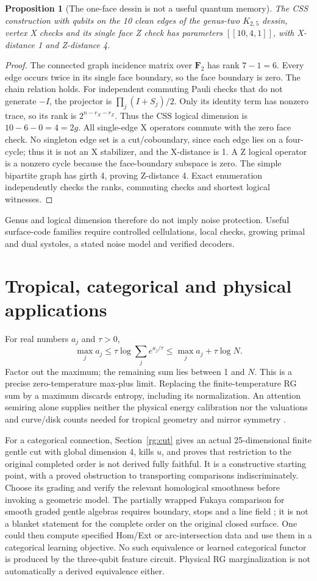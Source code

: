 \documentclass[11pt,oneside,openany]{book}
\newtheorem{proposition}[theorem]{Proposition}
\theoremstyle{definition}\newtheorem{definition}[theorem]{Definition}
\theoremstyle{remark}\newtheorem{remark}[theorem]{Remark}
\begin{document}
\begin{proposition}[The one-face dessin is not a useful quantum memory]
The CSS construction with qubits on the 10 clean edges of the genus-two
$ K_{2,5}$ dessin, vertex X checks and its single face Z check has parameters
$[[10,4,1]]$, with X-distance 1 and Z-distance 4.
\end{proposition}
\begin{proof}
The connected graph incidence matrix over $\mathbf F_2$ has rank $7-1=6$.
Every edge occurs twice in its single face boundary, so the face boundary
is zero. The chain relation holds. For independent commuting Pauli checks that do
not generate $-I $, the projector is $\prod_j(I+S_j)/2$. Only its identity
term has nonzero trace, so its rank is $2^{n-r_X-r_Z}$. Thus the CSS logical
dimension is $10-6-0=4=2 g $.
All single-edge X operators commute with the zero face check. No singleton
edge set is a cut/coboundary, since each edge lies on a four-cycle; thus it is not
an X stabilizer, and the X-distance is 1. A Z logical operator is a nonzero
cycle because the face-boundary subspace is zero. The simple bipartite graph
has girth 4, proving Z-distance 4. Exact enumeration independently checks the
ranks, commuting checks and shortest logical witnesses.
\end{proof}
Genus and logical dimension therefore do not imply noise protection.
Useful surface-code families require controlled cellulations, local checks,
growing primal and dual systoles, a stated noise model and verified decoders.

\section{Tropical, categorical and physical applications}
For real numbers $ a_j $ and $\tau>0$,
\[
 \max_j a_j\le\tau\log\sum_j e^{a_j/\tau}
       \le\max_j a_j+\tau\log N.
\]
Factor out the maximum; the remaining sum lies between 1 and $ N $. This is a
precise zero-temperature max-plus limit. Replacing the finite-temperature
RG sum by a maximum discards entropy, including its normalization. An
attention semiring alone supplies neither the physical energy calibration
nor the valuations and curve/disk counts needed for tropical geometry and
mirror symmetry \cite{QGrossSiebert}.

For a categorical connection, Section~\ref{rg:cut} gives an actual
25-dimensional finite gentle cut with global dimension 4, kills $ u $, and
proves that restriction to the original completed order is not derived fully
faithful. It is a constructive starting point, with a proved obstruction to
transporting comparisons indiscriminately. Choose its grading and verify the
relevant homological smoothness before invoking a geometric model.
The partially wrapped Fukaya comparison for smooth graded gentle algebras
requires boundary, stops and a line field \cite{LekiliPolishchuk}; it is not
a blanket statement for the complete order on the original closed surface.
One could then compute specified Hom/Ext or arc-intersection data and use
them in a categorical learning objective. No such equivalence or learned
categorical functor is produced by the three-qubit feature circuit. Physical
RG marginalization is not automatically a derived equivalence either.
\end{document}
